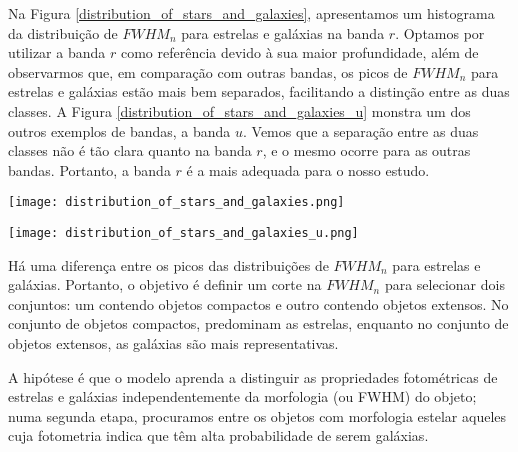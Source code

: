Na Figura \ref{distribution_of_stars_and_galaxies}, apresentamos um histograma da distribuição de $\textit{FWHM}_n$ para estrelas e galáxias na banda $r$. Optamos por utilizar a banda $r$ como referência devido à sua maior profundidade, além de observarmos que, em comparação com outras bandas, os picos de $\textit{FWHM}_n$ para estrelas e galáxias estão mais bem separados, facilitando a distinção entre as duas classes. A Figura \ref{distribution_of_stars_and_galaxies_u} monstra um dos outros exemplos de bandas, a banda $u$. Vemos que a separação entre as duas classes não é tão clara quanto na banda $r$, e o mesmo ocorre para as outras bandas. Portanto, a banda $r$ é a mais adequada para o nosso estudo. 


\begin{center}
    \begin{minipage}{0.45\textwidth}
        \centering
        \texttt{[image: distribution\_of\_stars\_and\_galaxies.png]}
        \captionsetup{}
        \label{distribution_of_stars_and_galaxies}
    \end{minipage}
    \hfill
    \begin{minipage}{0.45\textwidth}
        \centering
        \texttt{[image: distribution\_of\_stars\_and\_galaxies\_u.png]}
        \captionsetup{}
        \label{distribution_of_stars_and_galaxies_u}
    \end{minipage}
\end{center}

Há uma diferença entre os picos das distribuições de $\textit{FWHM}_n$ para estrelas e galáxias. Portanto, o objetivo é definir um corte na $\textit{FWHM}_n$ para selecionar dois conjuntos: um contendo objetos compactos e outro contendo objetos extensos. No conjunto de objetos compactos, predominam as estrelas, enquanto no conjunto de objetos extensos, as galáxias são mais representativas.

A hipótese é que o modelo aprenda a distinguir as propriedades fotométricas de estrelas e galáxias independentemente da morfologia (ou FWHM) do objeto; numa segunda etapa, procuramos entre os objetos com morfologia estelar aqueles cuja fotometria indica que têm alta probabilidade de serem galáxias.

